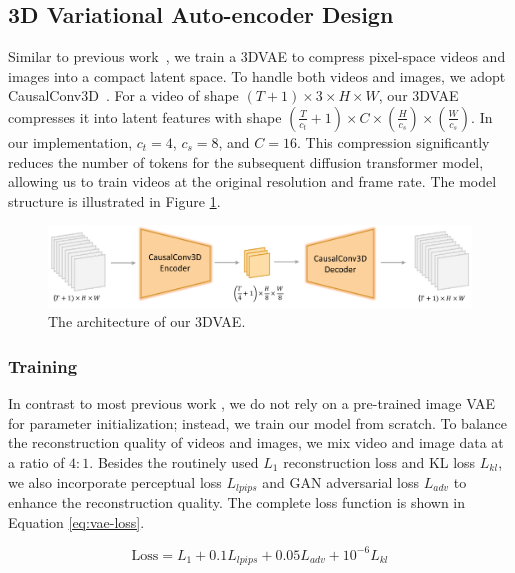 \subsection{3D Variational Auto-encoder Design}\label{3dVAE}

Similar to previous work~\cite{polyak2024movie,yang2024cogvideox}, we train a 3DVAE to compress pixel-space videos and images into a compact latent space. To handle both videos and images, we adopt CausalConv3D~\cite{yu2023language}. For a video of shape $(T+1) \times 3 \times H \times W$, our 3DVAE compresses it into latent features with shape $(\frac{T}{c_t} + 1) \times C \times (\frac{H}{c_s}) \times (\frac{W}{c_s})$. In our implementation, $c_t=4$, $c_s=8$, and $C=16$. This compression significantly reduces the number of tokens for the subsequent diffusion transformer model, allowing us to train videos at the original resolution and frame rate. The model structure is illustrated in Figure \ref{fig:vae-model-arch}.

\begin{figure}[t]
    \centering
    \includegraphics[width=0.95\linewidth]{figures/vae-model-arch.pdf}
    \caption{ The architecture of our 3DVAE.}
    \label{fig:vae-model-arch}
\end{figure}

\subsubsection{Training}
In contrast to most previous work \cite{polyak2024movie,chen2024od,zhou2024allegro}, we do not rely on a pre-trained image VAE for parameter initialization; instead, we train our model from scratch. 
To balance the reconstruction quality of videos and images, we mix video and image data at a ratio of $4:1$. Besides the routinely used $L_1$ reconstruction loss and KL loss $L_{kl}$, we also incorporate perceptual loss $L_{lpips}$ and GAN adversarial loss $L_{adv}$ \cite{esser2021taming} to enhance the reconstruction quality. The complete loss function is shown in Equation \ref{eq:vae-loss}.

\begin{equation}
    \label{eq:vae-loss}
    \text{Loss} = L_{1} + 0.1 L_{lpips} + 0.05 L_{adv} + 10^{-6} L_{kl}
\end{equation}


